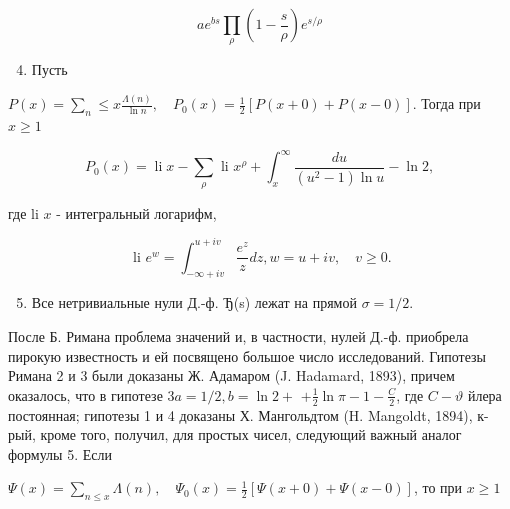 \documentclass[10pt]{article}
\begin{document}
\[

a e^{b s} \prod_{\rho}\left(1-\frac{s}{\rho}\right) e^{s / \rho}

\]



\begin{enumerate}

  \setcounter{enumi}{3}

  \item Пусть

\end{enumerate}



$P(x)=\sum_{n} \leqslant x \frac{\Lambda(n)}{\ln n}, \quad P_{0}(x)=\frac{1}{2}[P(x+0)+P(x-0)]$. Тогда при $x \geqslant 1$



\[

P_{0}(x)=\operatorname{li} x-\sum_{\rho} \text { li } x^{\rho}+\int_{x}^{\infty} \frac{d u}{\left(u^{2}-1\right) \ln u}-\ln 2,

\]



где li $x$ - интегральный логарифм,



\[

\text { li } e^{w}=\int_{-\infty+i v}^{u+i v} \frac{e^{z}}{z} d z, w=u+i v, \quad v \geqslant 0 .

\]



\begin{enumerate}

  \setcounter{enumi}{4}

  \item Все нетривиальные нули Д.-ф. Ђ(s) лежат на прямой $\sigma=1 / 2$.

\end{enumerate}



После Б. Римана проблема значений и, в частности, нулей Д.-ф. приобрела пирокую известность и ей посвящено большое число исследований. Гипотезы Римана 2 и 3 были доказаны Ж. Адамаром (J. Hadamard, 1893), причем оказалось, что в гипотезе $3 a=1 / 2, b=\ln 2+$ $+\frac{1}{2} \ln \pi-1-\frac{C}{2}$, где $C-\vartheta$ йлера постоянная; гипотезы 1 и 4 доказаны Х. Мангольдтом (H. Mangoldt, 1894), к-рый, кроме того, получил, для простых чисел, следующий важный аналог формулы 5. Если



$\Psi(x)=\sum_{n \leqslant x} \Lambda(n), \quad \Psi_{0}(x)=\frac{1}{2}[\Psi(x+0)+\Psi(x-0)]$, то при $x \geqslant 1$
\end{document}
